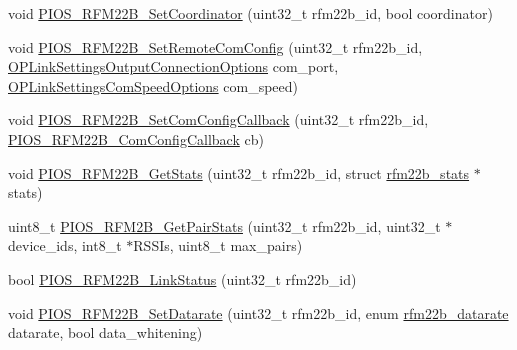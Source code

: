 \begin{DoxyCompactItemize}
void \hyperlink{group___p_i_o_s___r_f_m22_b_gaf27178ba026097c91627b50f862f388e}{\-P\-I\-O\-S\-\_\-\-R\-F\-M22\-B\-\_\-\-Set\-Coordinator} (uint32\-\_\-t rfm22b\-\_\-id, bool coordinator)
\item 
void \hyperlink{group___p_i_o_s___r_f_m22_b_ga74f4ab9cf6b2337fc517addf32e432d7}{\-P\-I\-O\-S\-\_\-\-R\-F\-M22\-B\-\_\-\-Set\-Remote\-Com\-Config} (uint32\-\_\-t rfm22b\-\_\-id, \hyperlink{group___o_p_link_settings_ga1511abaff051d1cd559ddd52fea0bfa8}{\-O\-P\-Link\-Settings\-Output\-Connection\-Options} com\-\_\-port, \hyperlink{group___o_p_link_settings_gaf4886a2c0a8f8a79c93d27c94ee503ba}{\-O\-P\-Link\-Settings\-Com\-Speed\-Options} com\-\_\-speed)
\item 
void \hyperlink{group___p_i_o_s___r_f_m22_b_gaa2f467cefea23fca9354817c336c2c7f}{\-P\-I\-O\-S\-\_\-\-R\-F\-M22\-B\-\_\-\-Set\-Com\-Config\-Callback} (uint32\-\_\-t rfm22b\-\_\-id, \hyperlink{group___p_i_o_s___r_f_m22_b_gaa8a316480e010f5e383d29257c0686cd}{\-P\-I\-O\-S\-\_\-\-R\-F\-M22\-B\-\_\-\-Com\-Config\-Callback} cb)
\item 
void \hyperlink{group___p_i_o_s___r_f_m22_b_ga7993764aede415744ac90bf71b2a84f5}{\-P\-I\-O\-S\-\_\-\-R\-F\-M22\-B\-\_\-\-Get\-Stats} (uint32\-\_\-t rfm22b\-\_\-id, struct \hyperlink{structrfm22b__stats}{rfm22b\-\_\-stats} $\ast$stats)
\item 
uint8\-\_\-t \hyperlink{group___p_i_o_s___r_f_m22_b_ga2c3963442036bf6e581c9c4e2e6447b9}{\-P\-I\-O\-S\-\_\-\-R\-F\-M2\-B\-\_\-\-Get\-Pair\-Stats} (uint32\-\_\-t rfm22b\-\_\-id, uint32\-\_\-t $\ast$device\-\_\-ids, int8\-\_\-t $\ast$\-R\-S\-S\-Is, uint8\-\_\-t max\-\_\-pairs)
\item 
bool \hyperlink{group___p_i_o_s___r_f_m22_b_ga5d2ba4c573bc63f53ccb80f3bdbbc8e4}{\-P\-I\-O\-S\-\_\-\-R\-F\-M22\-B\-\_\-\-Link\-Status} (uint32\-\_\-t rfm22b\-\_\-id)
\item 
void \hyperlink{group___p_i_o_s___r_f_m22_b_ga9f3c01f66fd57433e99bc863554a9a19}{\-P\-I\-O\-S\-\_\-\-R\-F\-M22\-B\-\_\-\-Set\-Datarate} (uint32\-\_\-t rfm22b\-\_\-id, enum \hyperlink{group___p_i_o_s___r_f_m22_b_gaa3e170044f27a00c422ee75f98130ef1}{rfm22b\-\_\-datarate} datarate, bool data\-\_\-whitening)
\end{DoxyCompactItemize}
